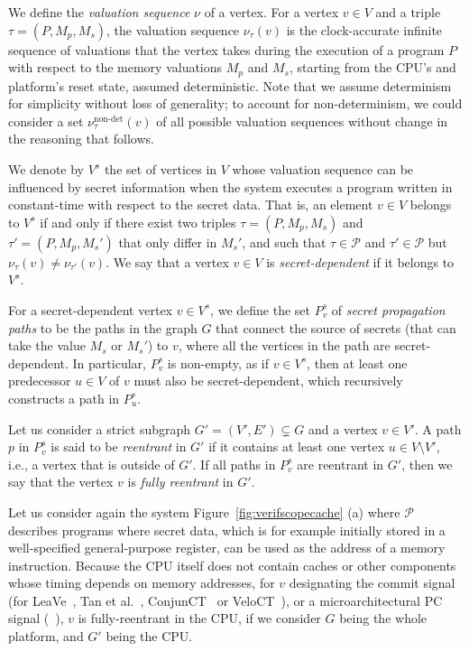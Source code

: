 We define the \emph{valuation sequence} $\nu$ of a vertex.
For a vertex $v \in V$ and a triple $\tau = (P, M_p, M_s)$, the valuation sequence $\nu_\tau(v)$ is the clock-accurate infinite sequence of valuations that the vertex takes during the execution of a program $P$ with respect to the memory valuations $M_p$ and $M_s$, starting from the CPU's and platform's reset state, assumed deterministic.
Note that we assume determinism for simplicity without loss of generality; to account for non-determinism, we could consider a set $\nu_\tau^{\text{non-det}}(v)$ of all possible valuation sequences without change in the reasoning that follows.

We denote by $V^s$ the set of vertices in $V$ whose valuation sequence can be influenced by secret information when the system executes a program written in constant-time with respect to the secret data.
That is, an element $v \in V$ belongs to $V^s$ if and only if there exist two triples $\tau = (P, M_p, M_s)$ and $\tau' = (P, M_p, M_s')$ that only differ in $M_s'$, and such that $\tau \in \mathcal{P}$ and $\tau' \in \mathcal{P}$ but $\nu_\tau(v) \neq \nu_{\tau'}(v)$.
We say that a vertex $v \in V$ is \emph{secret-dependent} if it belongs to $V^s$.

For a secret-dependent vertex $v \in V^s$, we define the set $P^s_v$ of \emph{secret propagation paths} to be the paths in the graph $G$ that connect the source of secrets (that can take the value $M_s$ or $M_s'$) to $v$, where all the vertices in the path are secret-dependent.
In particular, $P^s_v$ is non-empty, as if $v \in V^s$, then at least one predecessor $u \in V$ of $v$ must also be secret-dependent, which recursively constructs a path in $P^s_u$.

Let us consider a strict subgraph $G' = (V', E') \subsetneq G$ and a vertex $v \in V'$.
A path $p$ in $P^s_v$ is said to be \emph{reentrant} in $G'$ if it contains at least one vertex $u \in V \setminus V'$, i.e., a vertex that is outside of $G'$.
If all paths in $P^s_v$ are reentrant in $G'$, then we say that the vertex $v$ is \emph{fully reentrant} in $G'$.

Let us consider again the system Figure~\ref{fig:verifscopecache} (a) where $\mathcal{P}$ describes programs where secret data, which is for example initially stored in a well-specified general-purpose register, can be used as the address of a memory instruction.
Because the CPU itself does not contain caches or other components whose timing depends on memory addresses, for $v$ designating the commit signal (for LeaVe~\cite{wang2023specification}, Tan et al.~\cite{tan2025contractshadowlogic}, ConjunCT~\cite{dinesh2024conjunct} or VeloCT~\cite{dinesh2025h}), or a microarchitectural PC signal (\ucfi~\cite{ceesay2024mucfi}), $v$ is fully-reentrant in the CPU, if we consider $G$ being the whole platform, and $G'$ being the CPU.

